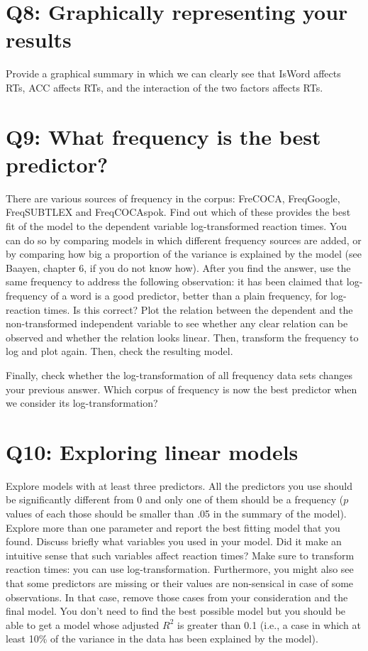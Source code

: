 \documentclass{article}\usepackage[]{graphicx}\usepackage[]{color}
\begin{document}
\section*{Q8: Graphically representing your results}

Provide a graphical summary in which we can clearly see that IsWord affects RTs, ACC affects RTs, and the interaction of the two factors affects RTs.

\section*{Q9: What frequency is the best predictor?}

There are various sources of frequency in the corpus: FreCOCA, FreqGoogle, FreqSUBTLEX and FreqCOCAspok. Find out which of these provides the best fit of the model to the dependent variable log-transformed reaction times. You can do so by comparing models in which different frequency sources are added, or by comparing how big a proportion of the variance is explained by the model (see Baayen, chapter 6, if you do not know how). After you find the answer, use the same frequency to address the following observation: it has been claimed that log-frequency of a word is a good predictor, better than a plain frequency, for log-reaction times. Is this correct? Plot the relation between the dependent and the non-transformed independent variable to see whether any clear relation can be observed and whether the relation looks linear. Then, transform the frequency to log and plot again. Then, check the resulting model.

Finally, check whether the log-transformation of all frequency data sets changes your previous answer. Which corpus of frequency is now the best predictor when we consider its log-transformation?

\section*{Q10: Exploring linear models}

Explore models with at least three predictors. All the predictors you use should be significantly different from 0 and only one of them should be a frequency ($p$ values of each those should be smaller than .05 in the summary of the model). Explore more than one parameter and report the best fitting model that you found. Discuss briefly what variables you used in your model. Did it make an intuitive sense that such variables affect reaction times? Make sure to transform reaction times: you can use log-transformation. Furthermore, you might also see that some predictors are missing or their values are non-sensical in case of some observations. In that case, remove those cases from your consideration and the final model. You don't need to find the best possible model but you should be able to get a model whose adjusted $R^2$ is greater than 0.1 (i.e., a case in which at least 10\% of the variance in the data has been explained by the model).
\end{document}
